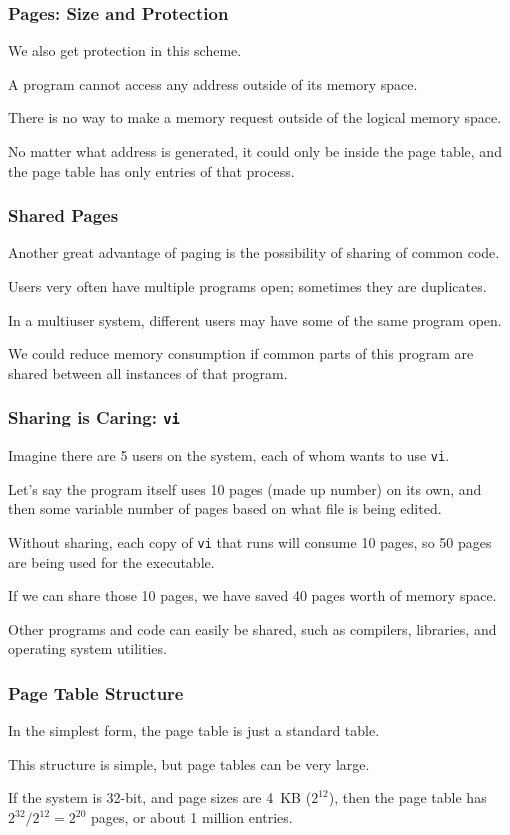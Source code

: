 \begin{frame}
\frametitle{Pages: Size and Protection}

We also get protection in this scheme.

A program cannot access any address outside of its memory space. 

There is no way to make a memory request outside of the logical memory space. 

No matter what address is generated, it could only be inside the page table, and the page table has only entries of that process.

\end{frame}

\begin{frame}
\frametitle{Shared Pages}

Another great advantage of paging is the possibility of sharing of common code. 

Users very often have multiple programs open; sometimes they are duplicates.

In a multiuser system, different users may have some of the same program open.

We could reduce memory consumption if common parts of this program are shared between all instances of that program.

\end{frame}


\begin{frame}
\frametitle{Sharing is Caring: \texttt{vi}}

Imagine there are 5 users on the system, each of whom wants to use \texttt{vi}. 

Let's say the program itself uses 10 pages (made up number) on its own, and then some variable number of pages based on what file is being edited. 

Without sharing, each copy of \texttt{vi} that runs will consume 10 pages, so 50 pages are being used for the executable. 

If we can share those 10 pages, we have saved 40 pages worth of memory space.

Other programs and code can easily be shared, such as compilers, libraries, and operating system utilities.

\end{frame}

\begin{frame}
\frametitle{Page Table Structure}

In the simplest form, the page table is just a standard table. 

This structure is simple, but page tables can be very large.

If the system is 32-bit, and page sizes are 4~KB ($2^{12}$), then the page table has $2^{32}/2^{12} = 2^{20}$ pages, or about 1 million entries.

\end{frame}

